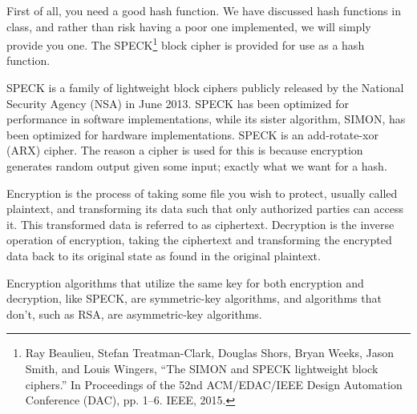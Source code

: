 \documentclass{article}
\begin{document}
\noindent
First of all, you need a good hash function. We have discussed hash functions in
class, and rather than risk having a poor one implemented, we will simply
provide you one. The
SPECK\footnote{
Ray Beaulieu, Stefan Treatman-Clark, Douglas Shors, Bryan Weeks, Jason Smith,
and Louis Wingers, ``The {SIMON} and {SPECK} lightweight block ciphers.'' In
Proceedings of the 52nd ACM/EDAC/IEEE Design Automation Conference (DAC), pp.
1--6. IEEE, 2015.}
block cipher is provided for use as a hash function.

SPECK is a family of lightweight block ciphers publicly released by the National
Security Agency (NSA) in June 2013.  SPECK has been optimized for performance in
software implementations, while its sister algorithm, SIMON, has been optimized
for hardware implementations. SPECK is an add-rotate-xor (ARX) cipher. The
reason a cipher is used for this is because encryption generates random output
given some input; exactly what we want for a hash.

Encryption is the process of taking some file you wish to protect, usually
called plaintext, and transforming its data such that only authorized parties
can access it. This transformed data is referred to as ciphertext. Decryption
is the inverse operation of encryption, taking the ciphertext and transforming
the encrypted data back to its original state as found in the original
plaintext.

Encryption algorithms that utilize the same key for both encryption and
decryption, like SPECK, are symmetric-key algorithms, and algorithms that don't,
such as RSA, are asymmetric-key algorithms.
\end{document}
